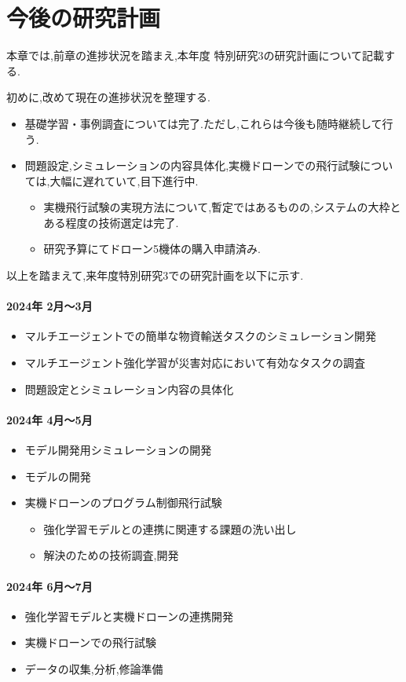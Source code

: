 \documentclass{article}[jsarticle]
\begin{document}
\section{今後の研究計画}
本章では,前章の進捗状況を踏まえ,本年度 特別研究3の研究計画について記載する.\par 
初めに,改めて現在の進捗状況を整理する.
\begin{itemize}
    \item 基礎学習・事例調査については完了.ただし,これらは今後も随時継続して行う.
    \item 問題設定,シミュレーションの内容具体化,実機ドローンでの飛行試験については,大幅に遅れていて,目下進行中.
    \begin{itemize}
        \item 実機飛行試験の実現方法について,暫定ではあるものの,システムの大枠とある程度の技術選定は完了.
        \item 研究予算にてドローン5機体の購入申請済み.
    \end{itemize}
\end{itemize}
以上を踏まえて,来年度特別研究3での研究計画を以下に示す.
\paragraph{2024年 2月～3月}
\begin{itemize}
    \item マルチエージェントでの簡単な物資輸送タスクのシミュレーション開発
    \item マルチエージェント強化学習が災害対応において有効なタスクの調査
    \item 問題設定とシミュレーション内容の具体化
\end{itemize}
\paragraph{2024年 4月～5月}
\begin{itemize}
    \item モデル開発用シミュレーションの開発
    \item モデルの開発
    \item 実機ドローンのプログラム制御飛行試験
    \begin{itemize}
        \item 強化学習モデルとの連携に関連する課題の洗い出し
        \item 解決のための技術調査,開発
    \end{itemize}
\end{itemize}
\paragraph{2024年 6月～7月}
\begin{itemize}
    \item 強化学習モデルと実機ドローンの連携開発
    \item 実機ドローンでの飛行試験
    \item データの収集,分析,修論準備
\end{itemize}
\end{document}
